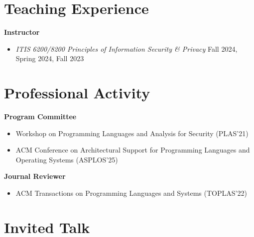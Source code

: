 \documentclass[11pt]{article}
\begin{document}
\section{Teaching Experience}
\textbf{Instructor}
\begin{itemize}
  \item \emph{ITIS 6200/8200 Principles of Information Security \& Privacy} \hfill Fall 2024, Spring 2024, Fall 2023
\end{itemize}





\section{Professional Activity}
\textbf{Program Committee}
\begin{itemize}
  \item Workshop on Programming Languages and Analysis for Security (PLAS'21)
  \item ACM Conference on Architectural Support for Programming Languages and Operating Systems (ASPLOS'25)
\end{itemize}

\textbf{Journal Reviewer}
\begin{itemize}
\item  ACM Transactions on Programming Languages and Systems (TOPLAS'22)
\end{itemize}

\section{Invited Talk}
\end{document}
